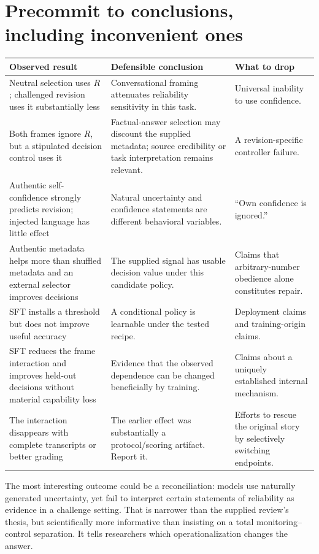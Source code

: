 \documentclass[11pt]{article}
\begin{document}
\section{Precommit to conclusions, including inconvenient ones}

\begin{tabularx}{\linewidth}{P{.29\linewidth}YY}
\toprule
Observed result & Defensible conclusion & What to drop\\
\midrule
Neutral selection uses $R$; challenged revision uses it substantially less & Conversational framing attenuates reliability sensitivity in this task. & Universal inability to use confidence.\\[5pt]
Both frames ignore $R$, but a stipulated decision control uses it & Factual-answer selection may discount the supplied metadata; source credibility or task interpretation remains relevant. & A revision-specific controller failure.\\[5pt]
Authentic self-confidence strongly predicts revision; injected language has little effect & Natural uncertainty and confidence statements are different behavioral variables. & ``Own confidence is ignored.''\\[5pt]
Authentic metadata helps more than shuffled metadata and an external selector improves decisions & The supplied signal has usable decision value under this candidate policy. & Claims that arbitrary-number obedience alone constitutes repair.\\[5pt]
SFT installs a threshold but does not improve useful accuracy & A conditional policy is learnable under the tested recipe. & Deployment claims and training-origin claims.\\[5pt]
SFT reduces the frame interaction and improves held-out decisions without material capability loss & Evidence that the observed dependence can be changed beneficially by training. & Claims about a uniquely established internal mechanism.\\[5pt]
The interaction disappears with complete transcripts or better grading & The earlier effect was substantially a protocol/scoring artifact. Report it. & Efforts to rescue the original story by selectively switching endpoints.\\
\bottomrule
\end{tabularx}

The most interesting outcome could be a reconciliation: models use naturally generated uncertainty, yet fail to interpret certain statements of reliability as evidence in a challenge setting. That is narrower than the supplied review's thesis, but scientifically more informative than insisting on a total monitoring--control separation. It tells researchers which operationalization changes the answer.
\end{document}

